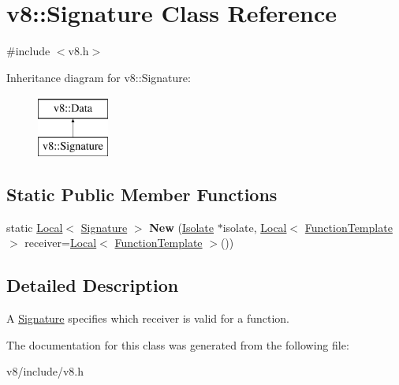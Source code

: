 \hypertarget{classv8_1_1Signature}{}\section{v8\+:\+:Signature Class Reference}
\label{classv8_1_1Signature}


{\ttfamily \#include $<$v8.\+h$>$}

Inheritance diagram for v8\+:\+:Signature\+:\begin{figure}[H]
\begin{center}
\leavevmode
\includegraphics[height=2.000000cm]{classv8_1_1Signature}
\end{center}
\end{figure}
\subsection*{Static Public Member Functions}
\begin{DoxyCompactItemize}
\item 
static \hyperlink{classv8_1_1Local}{Local}$<$ \hyperlink{classv8_1_1Signature}{Signature} $>$ {\bfseries New} (\hyperlink{classv8_1_1Isolate}{Isolate} $\ast$isolate, \hyperlink{classv8_1_1Local}{Local}$<$ \hyperlink{classv8_1_1FunctionTemplate}{Function\+Template} $>$ receiver=\hyperlink{classv8_1_1Local}{Local}$<$ \hyperlink{classv8_1_1FunctionTemplate}{Function\+Template} $>$())\hypertarget{classv8_1_1Signature_a4e3d622674ec1f735e9981ec3309320f}{}\label{classv8_1_1Signature_a4e3d622674ec1f735e9981ec3309320f}

\end{DoxyCompactItemize}


\subsection{Detailed Description}
A \hyperlink{classv8_1_1Signature}{Signature} specifies which receiver is valid for a function. 

The documentation for this class was generated from the following file\+:\begin{DoxyCompactItemize}
\item 
v8/include/v8.\+h\end{DoxyCompactItemize}
